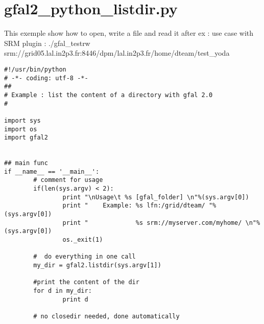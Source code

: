 \section{gfal2\_\-python\_\-listdir.py}
This exemple show how to open, write a file and read it after ex : use case with SRM plugin : ./gfal\_\-testrw srm://grid05.lal.in2p3.fr:8446/dpm/lal.in2p3.fr/home/dteam/test\_\-yoda



\begin{DocInclude}\begin{verbatim}#!/usr/bin/python
# -*- coding: utf-8 -*-
##
# Example : list the content of a directory with gfal 2.0
#

import sys
import os
import gfal2


## main func
if __name__ == '__main__':
        # comment for usage
        if(len(sys.argv) < 2):
                print "\nUsage\t %s [gfal_folder] \n"%(sys.argv[0])
                print "    Example: %s lfn:/grid/dteam/ "%(sys.argv[0])
                print "             %s srm://myserver.com/myhome/ \n"%(sys.argv[0])
                os._exit(1)
                
        #  do everything in one call
        my_dir = gfal2.listdir(sys.argv[1])

        #print the content of the dir
        for d in my_dir:
                print d
        
        # no closedir needed, done automatically 
\end{verbatim}
\end{DocInclude}
 